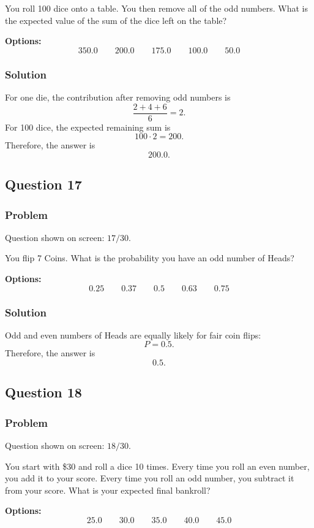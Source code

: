 \documentclass[12pt]{article}
\begin{document}
You roll 100 dice onto a table. You then remove all of the odd numbers. What is the expected value of the sum of the dice left on the table?

\noindent\textbf{Options:}
\[
\boxed{350.0}
\qquad
\boxed{200.0}
\qquad
\boxed{175.0}
\qquad
\boxed{100.0}
\qquad
\boxed{50.0}
\]

\subsubsection{Solution}
For one die, the contribution after removing odd numbers is
\[
\frac{2+4+6}{6}=2.
\]
For 100 dice, the expected remaining sum is
\[
100\cdot 2=200.
\]
Therefore, the answer is
\[
\boxed{200.0}.
\]

\subsection{Question 17}
\subsubsection{Problem}
Question shown on screen: \(17/30\).

You flip 7 Coins. What is the probability you have an odd number of Heads?

\noindent\textbf{Options:}
\[
\boxed{0.25}
\qquad
\boxed{0.37}
\qquad
\boxed{0.5}
\qquad
\boxed{0.63}
\qquad
\boxed{0.75}
\]

\subsubsection{Solution}
Odd and even numbers of Heads are equally likely for fair coin flips:
\[
P=0.5.
\]
Therefore, the answer is
\[
\boxed{0.5}.
\]

\subsection{Question 18}
\subsubsection{Problem}
Question shown on screen: \(18/30\).

You start with \$30 and roll a dice 10 times. Every time you roll an even number, you add it to your score. Every time you roll an odd number, you subtract it from your score. What is your expected final bankroll?

\noindent\textbf{Options:}
\[
\boxed{25.0}
\qquad
\boxed{30.0}
\qquad
\boxed{35.0}
\qquad
\boxed{40.0}
\qquad
\boxed{45.0}
\]
\end{document}
